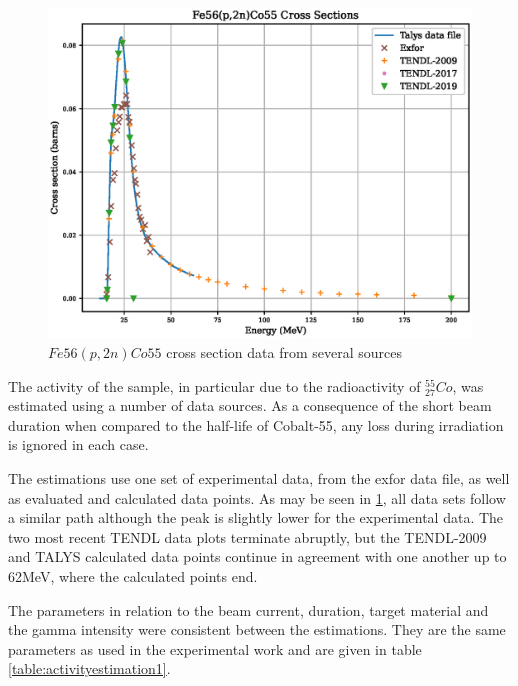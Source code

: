 \FloatBarrier
\begin{figure}[!htb]
\centering
\includegraphics[width=0.7\linewidth]{chapters/activity_code/fe56_co55/Fe56_Co55.eps}
\caption{$Fe56(p,2n)Co55$ cross section data from several sources \cite{tendl2009}\cite{tendl2017}\cite{tendl2019}\cite{exforco55}\cite{talys}}
\label{fig:fe56co55-cross-sections}
\end{figure}
\FloatBarrier

The activity of the sample, in particular due to the radioactivity of ${}^{55}_{27}Co$, was estimated using a number of data sources.  As a consequence of the short beam duration when compared to the half-life of Cobalt-55, any loss during irradiation is ignored in each case.  

The estimations use one set of experimental data, from the \acrshort{exfor} data file, as well as evaluated and calculated data points.  As may be seen in \ref{fig:fe56co55-cross-sections}, all data sets follow a similar path although the peak is slightly lower for the experimental data.  The two most recent TENDL data plots terminate abruptly, but the TENDL-2009 and TALYS calculated data points continue in agreement with one another up to 62MeV, where the calculated points end.

The parameters in relation to the beam current, duration, target material and the gamma intensity were consistent between the estimations.  They are the same parameters as used in the experimental work and are given in table \ref{table:activityestimation1}.

